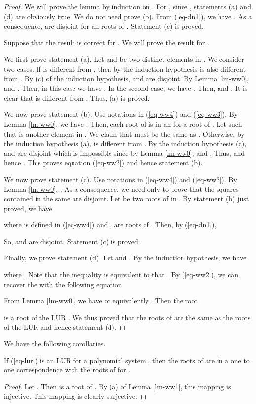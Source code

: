 \documentclass[amsthm]{JSC_LaTex_2007_Mar_12/elsart}
\def\bref#1{(\ref{#1})}
\begin{document}
\begin{proof}
We will prove the lemma by induction on .
For , since ,  statements (a) and (d) are
obviously true. We do not need prove (b).
From \bref{eq-dn1}, we have . As a consequence,  are
disjoint for all roots  of . Statement (c) is
proved.

Suppose that the result is correct for . We will prove
the result for .

We first prove statement (a). Let  and
 be two distinct elements in
.
We consider two cases. If  is different from
, then by the induction hypothesis
 is also
different from . By (c) of the induction hypothesis,
 and  are disjoint.
By Lemma \ref{lm-ww0},   and
. Then, in this case we have
.
In the second case, we have
. Then,
 and . It is clear
that  is
 different from . Thus, (a) is proved.

We now prove statement (b). Use notations in \bref{eq-ww4} and
\bref{eq-ww3}. By Lemma \ref{lm-ww0}, we have
. Then, each root of
 is in an  for a root
 of .
Let  such that
 is another element in  .
We claim that  must be the same as
. Otherwise, by the induction hypothesis
(a),  is different from . By the induction hypothesis
(c),  and   are
disjoint which is impossible since by Lemma \ref{lm-ww0},
 and
.
Thus,  and hence
. This proves
equation \bref{eq-ww2} and hence statement (b).

We now prove statement (c).
Use notations in \bref{eq-ww4} and \bref{eq-ww3}. By Lemma
\ref{lm-ww0}, .
As a consequence, we need only to prove that the squares
 contained in the same
 are disjoint. Let 
be two roots of  in . By
statement (b) just proved, we have

where  is defined in \bref{eq-ww4} and
, 
are roots of .   Then, by \bref{eq-dn1},

So,  and  are
disjoint. Statement (c) is proved.

Finally, we prove statement (d). Let
 and
. By the induction hypothesis, we
have

where . Note
that the inequality is equivalent to that .
By \bref{eq-ww2}, we can recover the  with the following
equation
 
From Lemma \ref{lm-ww0}, we have
 or equivalently
. Then the root

is a root of the LUR . We thus proved that the roots of  are the
same as the roots of the LUR and hence statement (d).
\end{proof}

We have the following corollaries.
\begin{cor}\label{cor-l1}
If \bref{eq-lur} is an LUR for a polynomial system , then the
roots of  are in a one to one correspondence with the roots
of  for .
\end{cor}
\begin{proof}
Let . Then
 is a root of .
By (a) of Lemma \ref{lm-ww1}, this mapping is injective. This
mapping is clearly surjective.
\end{proof}
\end{document}
